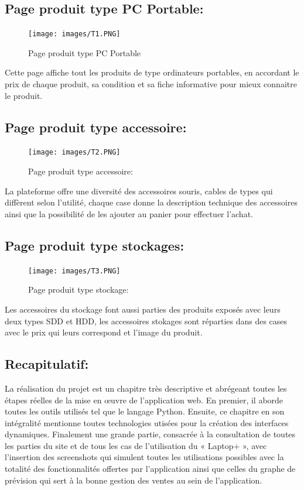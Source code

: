 \documentclass[a4paper,12pt]{report}
\begin{document}
\begin{doublespace}
\begin{doublespace}
\begin{doublespace}
\begin{doublespace}
\begin{doublespace}
\begin{doublespace}
\subsection{Page produit type PC Portable:}
\begin{figure}[H]
\begin{center}
 \texttt{[image: images/T1.PNG]}
 \caption{Page produit type PC Portable}
 \end{center}
\end{figure}
Cette page affiche tout les produits de type ordinateurs portables, en accordant le prix de chaque produit, sa condition et sa fiche informative pour mieux connaitre le produit.
\subsection{Page produit type accessoire:}
\begin{figure}[H]
\begin{center}
 \texttt{[image: images/T2.PNG]}
 \caption{Page produit type accessoire:}
 \end{center}
\end{figure}

La plateforme offre une diversité des accessoires souris, cables de types qui diffèrent selon l'utilité, chaque case donne la description technique des accessoires ainsi que la possibilité de les ajouter au panier pour effectuer l'achat.

\subsection{Page produit type stockages:}
\begin{figure}[H]
\begin{center}
 \texttt{[image: images/T3.PNG]}
 \caption{Page produit type stockage:}
 \end{center}
\end{figure}

Les accessoires du stockage font aussi parties des produits exposés avec leurs deux types SDD et HDD, les accessoires stokages sont réparties dans des cases avec le prix qui leurs correspond et l'image du produit. 
\subsection{Recapitulatif:}
La réalisation du projet est un chapitre très descriptive et abrégeant toutes les étapes réelles de la mise en œuvre de l'application web. En premier, il aborde toutes les outils utilisés tel que le langage  Python. Ensuite, ce chapitre en son intégralité mentionne toutes technologies utisées pour la création des interfaces dynamiques. Finalement une grande partie, consacrée à la consultation de toutes les parties du site et de tous les cas de l’utilisation du « Laptop+ », avec l’insertion des screenshots qui simulent toutes les utilisations possibles avec la totalité des fonctionnalités offertes par l'application ainsi que celles du graphe de prévision qui sert à la bonne gestion des ventes au sein de l'application.
\newpage

\end{doublespace}
\end{doublespace}
\end{doublespace}
\end{doublespace}
\end{doublespace}
\end{doublespace}
\end{document}
